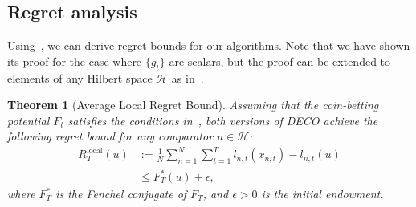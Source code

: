 \documentclass[journal]{IEEEtran} %
\newtheorem{theorem}{Theorem}
\newcommand{\Hil}{\mathcal{H}} %
\newcommand{\algname}{{DECO}\xspace}
\begin{document}
\subsection{Regret analysis}

Using~, we can derive regret bounds for our algorithms.
Note that we have shown its proof for the case where $\{g_t\}$ are scalars, but the proof can be extended to elements of any Hilbert space $\Hil$ as in~\cite[Theorem 3]{orabona_coin_2016}.

\begin{theorem}[Average Local Regret Bound]\label{thm:local_avg_regret_bound}
    Assuming that the coin-betting potential $F_t$ satisfies the conditions in~, both versions of \algname{} achieve the following regret bound for any comparator $u \in \Hil$:
    \begin{align}
        R_T^{\text{local}}(u) & := \frac{1}{N} \sum_{n=1}^N \sum_{t=1}^T l_{n,t}(x_{n,t}) - l_{n,t}(u) \\
                              & \leq F_T^*(u) + \epsilon,
    \end{align}
    where $F_T^*$ is the Fenchel conjugate of $F_T$, and $\epsilon > 0$ is the initial endowment.
\end{theorem}
\end{document}
